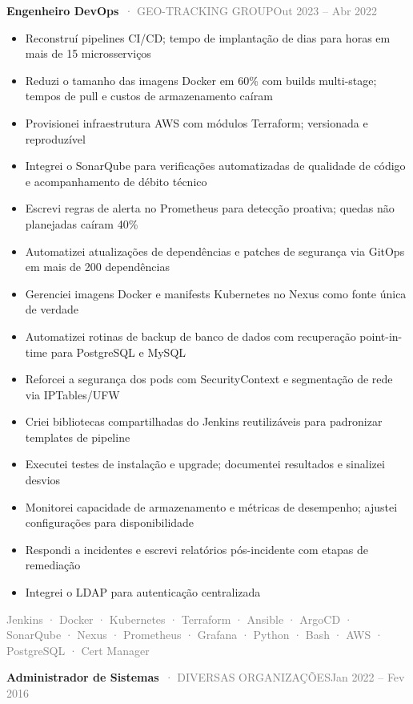 \documentclass[10pt,a4paper]{article}
\newcommand{\cventry}[3]{\textbf{#1}\ \textcolor{graytext}{· #2}\hfill\textcolor{graytext}{\small #3}\par}
\newcommand{\tagline}[1]{\textcolor{graytext}{\small #1}\par}
\begin{document}
\cventry{Engenheiro DevOps}{GEO-TRACKING GROUP}{Out 2023 – Abr 2022}
\begin{itemize}
  \item Reconstruí pipelines CI/CD; tempo de implantação de dias para horas em mais de 15 microsserviços
  \item Reduzi o tamanho das imagens Docker em 60\% com builds multi-stage; tempos de pull e custos de armazenamento caíram
  \item Provisionei infraestrutura AWS com módulos Terraform; versionada e reproduzível
  \item Integrei o SonarQube para verificações automatizadas de qualidade de código e acompanhamento de débito técnico
  \item Escrevi regras de alerta no Prometheus para detecção proativa; quedas não planejadas caíram 40\%
  \item Automatizei atualizações de dependências e patches de segurança via GitOps em mais de 200 dependências
  \item Gerenciei imagens Docker e manifests Kubernetes no Nexus como fonte única de verdade
  \item Automatizei rotinas de backup de banco de dados com recuperação point-in-time para PostgreSQL e MySQL
  \item Reforcei a segurança dos pods com SecurityContext e segmentação de rede via IPTables/UFW
  \item Criei bibliotecas compartilhadas do Jenkins reutilizáveis para padronizar templates de pipeline
  \item Executei testes de instalação e upgrade; documentei resultados e sinalizei desvios
  \item Monitorei capacidade de armazenamento e métricas de desempenho; ajustei configurações para disponibilidade
  \item Respondi a incidentes e escrevi relatórios pós-incidente com etapas de remediação
  \item Integrei o LDAP para autenticação centralizada
\end{itemize}
\tagline{Jenkins · Docker · Kubernetes · Terraform · Ansible · ArgoCD · SonarQube · Nexus · Prometheus · Grafana · Python · Bash · AWS · PostgreSQL · Cert Manager}
\vspace{1pt}
\vspace{3pt}
\cventry{Administrador de Sistemas}{DIVERSAS ORGANIZAÇÕES}{Jan 2022 – Fev 2016}
\end{document}
